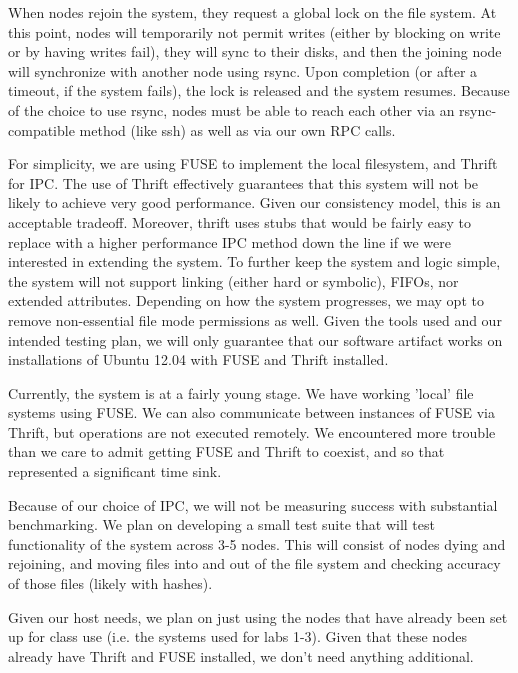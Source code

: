 When nodes rejoin the system, they request a global lock on the file system. At
this point, nodes will temporarily not permit writes (either by blocking on
write or by having writes fail), they will sync to their disks, and then the
joining node will synchronize with another node using rsync. Upon completion (or
after a timeout, if the system fails), the lock is released and the system
resumes. Because of the choice to use rsync, nodes must be able to reach each
other via an rsync-compatible method (like ssh) as well as via our own RPC
calls.

For simplicity, we are using FUSE to implement the local filesystem, and Thrift
for IPC. The use of Thrift effectively guarantees that this system will not be
likely to achieve very good performance. Given our consistency model, this is an
acceptable tradeoff. Moreover, thrift uses stubs that would be fairly easy to
replace with a higher performance IPC method down the line if we were interested
in extending the system. To further keep the system and logic simple, the system
will not support linking (either hard or symbolic), FIFOs, nor extended
attributes. Depending on how the system progresses, we may opt to remove
non-essential file mode permissions as well. Given the tools used and our
intended testing plan, we will only guarantee that our software artifact works
on installations of Ubuntu  12.04 with FUSE and Thrift installed.

Currently, the system is at a fairly young stage. We have working 'local' file
systems using FUSE. We can also communicate between instances of FUSE via
Thrift, but operations are not executed remotely. We encountered more trouble
than we care to admit getting FUSE and Thrift to coexist, and so that
represented a significant time sink.

Because of our choice of IPC, we will not be measuring success with substantial
benchmarking. We plan on developing a small test suite that will test
functionality of the system across 3-5 nodes. This will consist of nodes dying
and rejoining, and moving files into and out of the file system and checking
accuracy of those files (likely with hashes).

Given our host needs, we plan on just using the nodes that have already been set
up for class use (i.e. the systems used for labs 1-3). Given that these nodes
already have Thrift and FUSE installed, we don't need anything additional.

